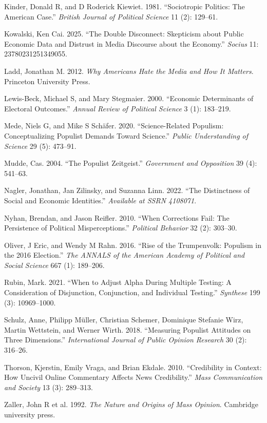 \documentclass[
  12pt]{article}
\newlength{\cslhangindent}
\newenvironment{CSLReferences}[2] %
 {\begin{list}{}{%
  \setlength{\itemindent}{0pt}
  \setlength{\leftmargin}{0pt}
  \setlength{\parsep}{0pt}
  \ifodd #1
   \setlength{\leftmargin}{\cslhangindent}
   \setlength{\itemindent}{-1\cslhangindent}
  \fi
  \setlength{\itemsep}{#2\baselineskip}}}
 {\end{list}}
\begin{document}
\begin{CSLReferences}{1}{1}
Kinder, Donald R, and D Roderick Kiewiet. 1981. {``Sociotropic Politics:
The American Case.''} \emph{British Journal of Political Science} 11
(2): 129--61.

Kowalski, Ken Cai. 2025. {``The Double Disconnect: Skepticism about
Public Economic Data and Distrust in Media Discourse about the
Economy.''} \emph{Socius} 11: 23780231251349055.

Ladd, Jonathan M. 2012. \emph{Why Americans Hate the Media and How It
Matters}. Princeton University Press.

Lewis-Beck, Michael S, and Mary Stegmaier. 2000. {``Economic
Determinants of Electoral Outcomes.''} \emph{Annual Review of Political
Science} 3 (1): 183--219.

Mede, Niels G, and Mike S Schäfer. 2020. {``Science-Related Populism:
Conceptualizing Populist Demands Toward Science.''} \emph{Public
Understanding of Science} 29 (5): 473--91.

Mudde, Cas. 2004. {``The Populist Zeitgeist.''} \emph{Government and
Opposition} 39 (4): 541--63.

Nagler, Jonathan, Jan Zilinsky, and Suzanna Linn. 2022. {``The
Distinctness of Social and Economic Identities.''} \emph{Available at
SSRN 4108071}.

Nyhan, Brendan, and Jason Reifler. 2010. {``When Corrections Fail: The
Persistence of Political Misperceptions.''} \emph{Political Behavior} 32
(2): 303--30.

Oliver, J Eric, and Wendy M Rahn. 2016. {``Rise of the Trumpenvolk:
Populism in the 2016 Election.''} \emph{The ANNALS of the American
Academy of Political and Social Science} 667 (1): 189--206.

Rubin, Mark. 2021. {``When to Adjust Alpha During Multiple Testing: A
Consideration of Disjunction, Conjunction, and Individual Testing.''}
\emph{Synthese} 199 (3): 10969--1000.

Schulz, Anne, Philipp Müller, Christian Schemer, Dominique Stefanie
Wirz, Martin Wettstein, and Werner Wirth. 2018. {``Measuring Populist
Attitudes on Three Dimensions.''} \emph{International Journal of Public
Opinion Research} 30 (2): 316--26.

Thorson, Kjerstin, Emily Vraga, and Brian Ekdale. 2010. {``Credibility
in Context: How Uncivil Online Commentary Affects News Credibility.''}
\emph{Mass Communication and Society} 13 (3): 289--313.

{Zaller, John R et al.} 1992. \emph{The Nature and Origins of Mass
Opinion}. Cambridge university press.

\end{CSLReferences}
\end{document}
